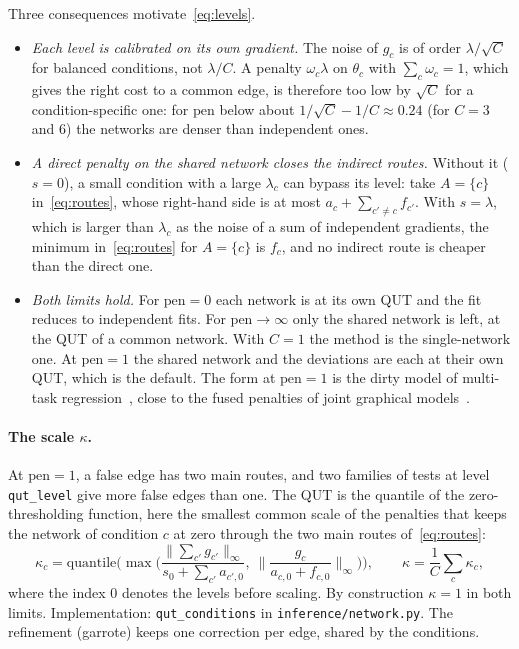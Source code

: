 \documentclass[a4paper, 11pt]{article}
\newcommand{\pen}{\mathrm{pen}}
\theoremstyle{plain}
\theoremstyle{remark}
\begin{document}
Three consequences motivate~\eqref{eq:levels}.
\begin{itemize}[leftmargin=*]
\item \emph{Each level is calibrated on its own gradient.} The noise of $g_c$ is of order $\lambda / \sqrt C$ for balanced conditions, not $\lambda / C$. A penalty $\omega_c \lambda$ on $\theta_c$ with $\sum_c \omega_c = 1$, which gives the right cost to a common edge, is therefore too low by $\sqrt C$ for a condition-specific one: for $\pen$ below about $1/\sqrt C - 1/C \approx 0.24$ (for $C = 3$ and $6$) the networks are denser than independent ones.
\item \emph{A direct penalty on the shared network closes the indirect routes.} Without it ($s = 0$), a small condition with a large $\lambda_c$ can bypass its level: take $A = \{c\}$ in~\eqref{eq:routes}, whose right-hand side is at most $a_c + \sum_{c' \ne c} f_{c'}$. With $s = \lambda$, which is larger than $\lambda_c$ as the noise of a sum of independent gradients, the minimum in~\eqref{eq:routes} for $A = \{c\}$ is $f_c$, and no indirect route is cheaper than the direct one.
\item \emph{Both limits hold.} For $\pen = 0$ each network is at its own QUT and the fit reduces to independent fits. For $\pen \to \infty$ only the shared network is left, at the QUT of a common network. With $C = 1$ the method is the single-network one. At $\pen = 1$ the shared network and the deviations are each at their own QUT, which is the default. The form at $\pen = 1$ is the dirty model of multi-task regression~\cite{jalali2010dirty}, close to the fused penalties of joint graphical models~\cite{danaher2014joint}.
\end{itemize}

\paragraph{The scale $\kappa$.} At $\pen = 1$, a false edge has two main routes, and two families of tests at level \texttt{qut\_level} give more false edges than one. The QUT is the quantile of the zero-thresholding function, here the smallest common scale of the penalties that keeps the network of condition $c$ at zero through the two main routes of~\eqref{eq:routes}:
\begin{equation}
\kappa_c = \mathrm{quantile}\Big(\max\Big(\frac{\|\sum_{c'} g_{c'}\|_\infty}{s_0 + \sum_{c'} a_{c',0}},\ \Big\|\frac{g_c}{a_{c,0} + f_{c,0}}\Big\|_\infty\Big)\Big), \qquad \kappa = \frac 1 C \sum_c \kappa_c,
\end{equation}
where the index $0$ denotes the levels before scaling. By construction $\kappa = 1$ in both limits. Implementation: \texttt{qut\_conditions} in \texttt{inference/network.py}. The refinement (garrote) keeps one correction per edge, shared by the conditions.
\end{document}
